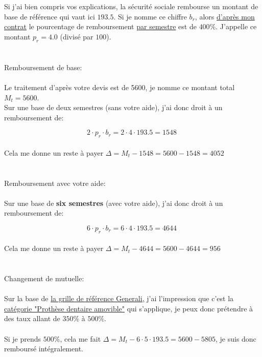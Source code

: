 Si j'ai bien compris vos explications, la sécurité sociale rembourse un montant de base de référence qui vaut ici $193.5$\EUR{}. Si je nomme ce chiffre $b_r$, alors \textcolor{pkl}{\href{https://imgur.com/a/fOoB4QB}{d'après mon contrat}} le pourcentage de remboursement \underline{par semestre} est de $400\%$. J'appelle ce montant $p_r = 4.0$ (divisé par $100$).
\\\\\\
\textcolor{pp}{\large Remboursement de base:}\\\\
Le traitement d'après votre devis est de 5600\EUR{}, je nomme ce montant total $M_t = 5600$.\\
Sur une base de deux semestres (sans votre aide), j'ai donc droit à un remboursement de:

$$2 \cdot p_r\cdot b_r = 2 \cdot 4\cdot 193.5 = 1548\;$$\\
Cela me donne un reste à payer $\Delta = M_t - 1548 = 5600- 1548 = 4052$\EUR{}
\\\\\\
\textcolor{pp}{\large Remboursement avec votre aide:}\\\\
Sur une base de \textbf{six semestres} (avec votre aide), j'ai donc droit à un remboursement de:

$$6 \cdot p_r\cdot b_r = 6 \cdot 4\cdot 193.5 = 4644\;$$\\
Cela me donne un reste à payer $\Delta = M_t - 4644 = 5600- 4644 = 956$\EUR{}
\\\\\\
\textcolor{pp}{\large Changement de mutuelle:}\\\\
Sur la base de \textcolor{pkl}{\href{https://www.generali.fr/sites/default/files-d8/2022-04/Tableaugarantiessantesalarie_0.pdf}{la grille de référence Generali,}} j'ai l'impression que c'est la \textcolor{pkl}{\href{https://imgur.com/a/EfqjJm8}{catégorie "Prothèse dentaire amovible"}} qui s'applique, je peux donc prétendre à des taux allant de $350\%$ à $500\%$.
\\\\
Si je prends $500\%$, cela me fait $\Delta = M_t - 6 \cdot 5\cdot 193.5 = 5600 - 5805$, je suis donc remboursé intégralement.